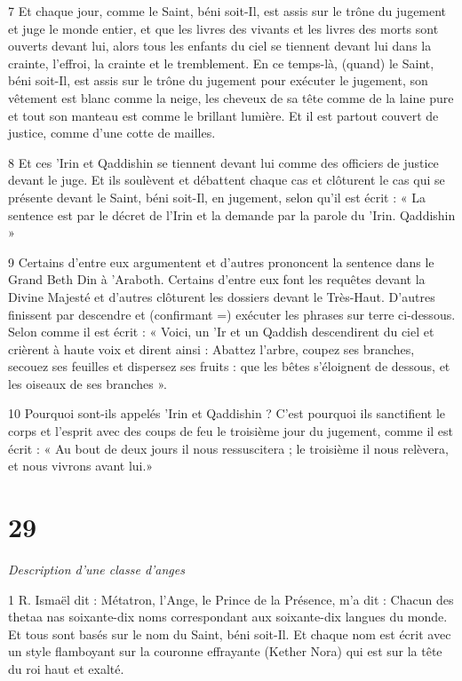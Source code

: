 \par 7 Et chaque jour, comme le Saint, béni soit-Il, est assis sur le trône du jugement et juge le monde entier, et que les livres des vivants et les livres des morts sont ouverts devant lui, alors tous les enfants du ciel se tiennent devant lui dans la crainte, l'effroi, la crainte et le tremblement. En ce temps-là, (quand) le Saint, béni soit-Il, est assis sur le trône du jugement pour exécuter le jugement, son vêtement est blanc comme la neige, les cheveux de sa tête comme de la laine pure et tout son manteau est comme le brillant lumière. Et il est partout couvert de justice, comme d'une cotte de mailles.

\par 8 Et ces 'Irin et Qaddishin se tiennent devant lui comme des officiers de justice devant le juge. Et ils soulèvent et débattent chaque cas et clôturent le cas qui se présente devant le Saint, béni soit-Il, en jugement, selon qu'il est écrit : « La sentence est par le décret de l'Irin et la demande par la parole du 'Irin. Qaddishin »

\par 9 Certains d'entre eux argumentent et d'autres prononcent la sentence dans le Grand Beth Din à 'Araboth. Certains d'entre eux font les requêtes devant la Divine Majesté et d'autres clôturent les dossiers devant le Très-Haut. D'autres finissent par descendre et (confirmant =) exécuter les phrases sur terre ci-dessous. Selon comme il est écrit : « Voici, un 'Ir et un Qaddish descendirent du ciel et crièrent à haute voix et dirent ainsi : Abattez l'arbre, coupez ses branches, secouez ses feuilles et dispersez ses fruits : que les bêtes s'éloignent de dessous, et les oiseaux de ses branches ».

\par 10 Pourquoi sont-ils appelés 'Irin et Qaddishin ? C'est pourquoi ils sanctifient le corps et l'esprit avec des coups de feu le troisième jour du jugement, comme il est écrit : « Au bout de deux jours il nous ressuscitera ; le troisième il nous relèvera, et nous vivrons avant lui.»

\chapter{29}

\par \textit{Description d'une classe d'anges}

\par 1 R. Ismaël dit : Métatron, l'Ange, le Prince de la Présence, m'a dit : Chacun des thetaa nas soixante-dix noms correspondant aux soixante-dix langues du monde. Et tous sont basés sur le nom du Saint, béni soit-Il. Et chaque nom est écrit avec un style flamboyant sur la couronne effrayante (Kether Nora) qui est sur la tête du roi haut et exalté.

